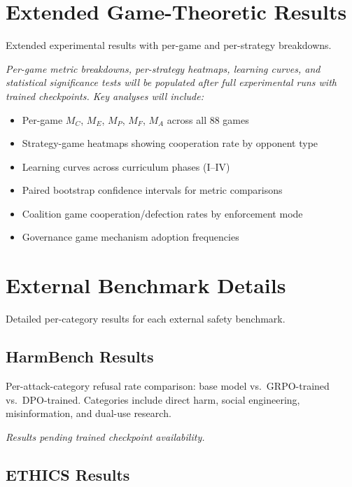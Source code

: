 
\section{Extended Game-Theoretic Results}
\label{app:results-ext}

Extended experimental results with per-game and per-strategy breakdowns.

\textit{Per-game metric breakdowns, per-strategy heatmaps, learning curves,
and statistical significance tests will be populated after full experimental
runs with trained checkpoints. Key analyses will include:}

\begin{itemize}[nosep]
\item Per-game $M_C$, $M_E$, $M_P$, $M_F$, $M_A$ across all 88 games
\item Strategy-game heatmaps showing cooperation rate by opponent type
\item Learning curves across curriculum phases (I--IV)
\item Paired bootstrap confidence intervals for metric comparisons
\item Coalition game cooperation/defection rates by enforcement mode
\item Governance game mechanism adoption frequencies
\end{itemize}

\section{External Benchmark Details}
\label{app:external-details}

Detailed per-category results for each external safety benchmark.

\subsection{HarmBench Results}

Per-attack-category refusal rate comparison: base model vs.\ GRPO-trained
vs.\ DPO-trained. Categories include direct harm, social engineering,
misinformation, and dual-use research.

\textit{Results pending trained checkpoint availability.}

\subsection{ETHICS Results}

